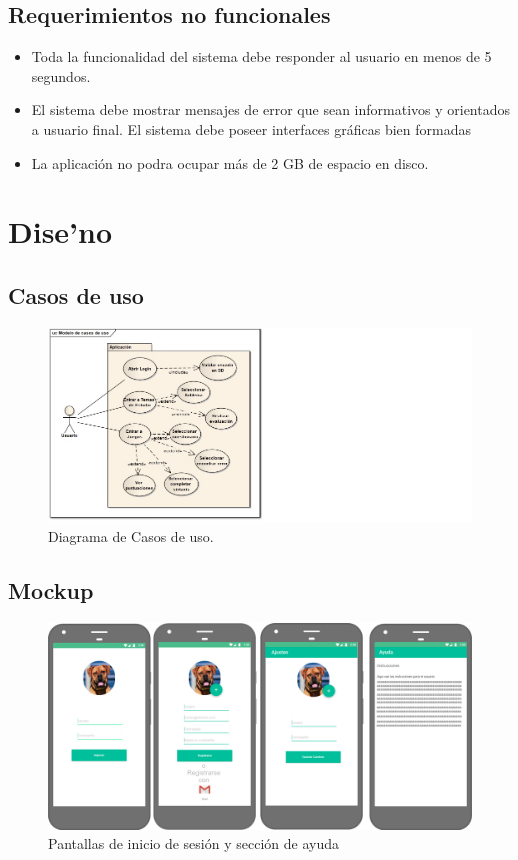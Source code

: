 \subsection{Requerimientos no funcionales}
\begin{itemize}
\item Toda la funcionalidad del sistema debe responder al usuario en menos de 5 segundos.
\item El sistema debe mostrar mensajes de error que sean informativos y orientados a usuario final.
\subitem El sistema debe poseer interfaces gráficas bien formadas
\item La aplicación no podra ocupar más de 2 GB de espacio en disco.
\end{itemize}
\section{Dise'no}
\subsection{Casos de uso}
\begin{center}
\begin{figure}[H]
\includegraphics[scale=0.8]{img/uso.jpg} 
\caption{Diagrama de Casos de uso.}
\end{figure}
\end{center}
\subsection{Mockup}
\begin{center}
\begin{figure}[H]
\includegraphics[scale=0.2]{img/m1.png} 
\caption{Pantallas de inicio de sesión y sección de ayuda}
\end{figure}
\end{center}

